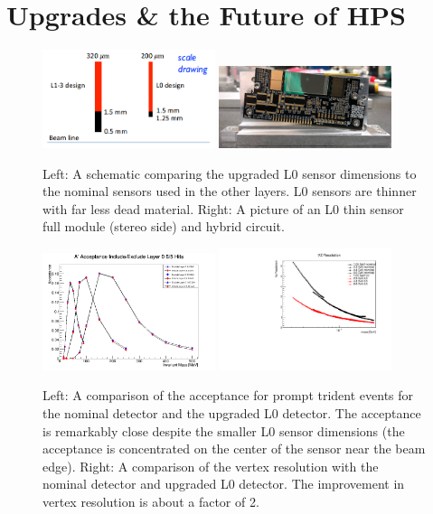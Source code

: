 \chapter{Upgrades \& the Future of HPS}\label{chap:upgrades}

\begin{figure}
    \centering
    \includegraphics[width=0.45\textwidth]{figs/upgrades/L0_design.png}
    \includegraphics[width=0.45\textwidth]{figs/upgrades/L0.png}
    \caption{Left: A schematic comparing the upgraded L0 sensor dimensions to the nominal sensors used in the other layers. L0 sensors are thinner with far less dead material. Right: A picture of an L0 thin sensor full module (stereo side) and hybrid circuit.}
    \label{fig:L0}
\end{figure}

\begin{figure}
    \centering
    \includegraphics[width=0.45\textwidth]{figs/upgrades/TridentAcceptanceInL0ExL05hit.png}
    \includegraphics[width=0.45\textwidth]{figs/upgrades/VZ_Resolution_total.pdf}
    \caption{Left: A comparison of the acceptance for prompt trident events for the nominal detector and the upgraded L0 detector. The acceptance is remarkably close despite the smaller L0 sensor dimensions (the acceptance is concentrated on the center of the sensor near the beam edge). Right: A comparison of the vertex resolution with the nominal detector and upgraded L0 detector. The improvement in vertex resolution is about a factor of 2.}
    \label{fig:L0acceptance}
\end{figure}

